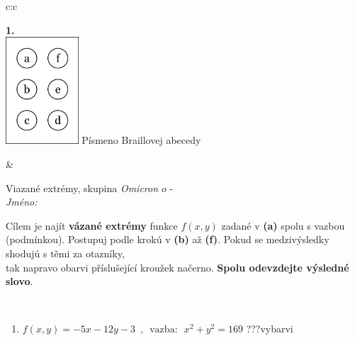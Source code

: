 \documentclass[10pt]{report}
\newcommand\omicron{o}
\begin{document}
\begin{tabular}{c:c}
\begin{minipage}[c][104.5mm][t]{0.5\linewidth}
\begin{center}
\begin{minipage}{0.79\linewidth}
\begin{center}
\begin{varwidth}{\linewidth}
\begin{enumerate}
\end{enumerate}
\end{varwidth}
\end{center}
\end{minipage}
\begin{minipage}{0.20\linewidth}
\begin{center}
{\Huge\bfseries 1.} \\[2mm]
\includegraphics[height=40mm]{../images/braille.png}
{\small Písmeno Braillovej abecedy}
\end{center}
\end{minipage}
\end{center}
\end{minipage}
&
\begin{minipage}[c][104.5mm][t]{0.5\linewidth}
\begin{center}
\vspace{7mm}
{\huge Viazané extrémy, skupina \textit{Omicron $\omicron$} -}\\[5mm]
\textit{Jméno:}\phantom{xxxxxxxxxxxxxxxxxxxxxxxxxxxxxxxxxxxxxxxxxxxxxxxxxxxxxxxxxxxxxxxxx}\\[5mm]
\begin{minipage}{0.95\linewidth}
\begin{center}
Cílem je najít \textbf{vázané extrémy} funkce $f(x,y)$ zadané v \textbf{(a)} spolu s vazbou (podmínkou). Postupuj podle krokú v \textbf{(b)} až \textbf{(f)}. Pokud se medzivýsledky shodujú s těmi za otazníky,\\tak napravo obarvi příslušející kroužek načerno. \textbf{Spolu odevzdejte výsledné slovo}.
\end{center}
\end{minipage}
\\[1mm]
\begin{minipage}{0.79\linewidth}
\begin{center}
\begin{varwidth}{\linewidth}
\begin{enumerate}
\normalsize
\item $f(x,y)=-5x-12y-3 \enspace , \enspace \mathrm{vazba:} \enspace x^2+y^2=169$\quad \dotfill\; ???\;\dotfill \quad vybarvi

\end{enumerate}
\end{varwidth}
\end{center}
\end{minipage}
\end{center}
\end{minipage}
\end{tabular}
\end{document}
